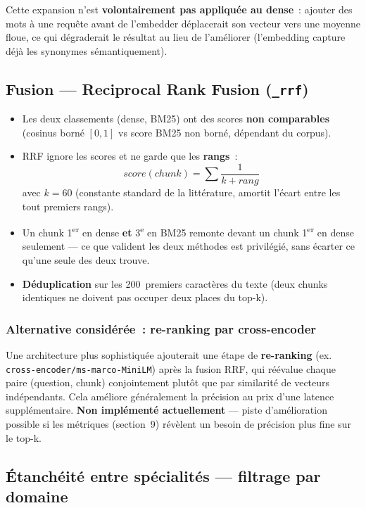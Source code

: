 \documentclass[11pt]{article}
\begin{document}
Cette expansion n'est \textbf{volontairement pas appliquée au dense}~: ajouter des mots à une
requête avant de l'embedder déplacerait son vecteur vers une moyenne floue, ce qui dégraderait le
résultat au lieu de l'améliorer (l'embedding capture déjà les synonymes sémantiquement).

\subsection{Fusion --- Reciprocal Rank Fusion (\texttt{\_rrf})}

\begin{itemize}
  \item Les deux classements (dense, BM25) ont des scores \textbf{non comparables} (cosinus borné
        $[0,1]$ vs score BM25 non borné, dépendant du corpus).
  \item RRF ignore les scores et ne garde que les \textbf{rangs}~:
        $$score(chunk) = \sum \frac{1}{k + rang}$$
        avec $k = 60$ (constante standard de la littérature, amortit l'écart entre les tout
        premiers rangs).
  \item Un chunk 1\textsuperscript{er} en dense \textbf{et} 3\textsuperscript{e} en BM25 remonte
        devant un chunk 1\textsuperscript{er} en dense seulement --- ce que valident les deux
        méthodes est privilégié, sans écarter ce qu'une seule des deux trouve.
  \item \textbf{Déduplication} sur les 200~premiers caractères du texte (deux chunks identiques ne
        doivent pas occuper deux places du top-k).
\end{itemize}

\subsubsection*{Alternative considérée~: re-ranking par cross-encoder}

Une architecture plus sophistiquée ajouterait une étape de \textbf{re-ranking} (ex.
\texttt{cross-encoder/ms-marco-MiniLM}) après la fusion RRF, qui réévalue chaque paire (question,
chunk) conjointement plutôt que par similarité de vecteurs indépendants. Cela améliore généralement
la précision au prix d'une latence supplémentaire. \textbf{Non implémenté actuellement} --- piste
d'amélioration possible si les métriques (section~9) révèlent un besoin de précision plus fine sur
le top-k.

\subsection{Étanchéité entre spécialités --- filtrage par domaine}
\label{sec:filtrage-domaine}
\end{document}
